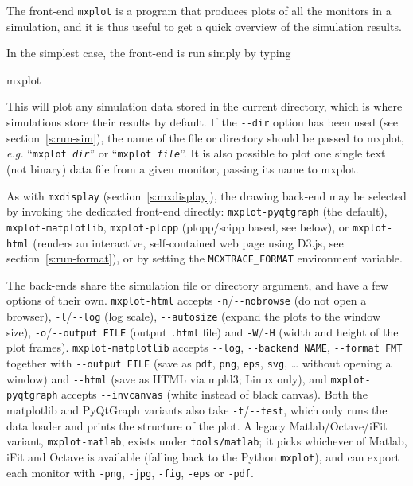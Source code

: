 The front-end \verb+mxplot+ is a program that produces
plots of all the monitors in a simulation, and it is thus useful to get
a quick overview of the simulation results.

In the simplest case, the front-end is run simply by typing
\begin{bash}
    mxplot
\end{bash}
This will plot any simulation data stored in the current directory, which is
where simulations store their results by default. If the \verb+--dir+
option has been used (see section~\ref{s:run-sim}), the name of
the file or directory should be passed to mxplot, {\em e.g.} ``\texttt{mxplot
  \textit{dir}}'' or ``\texttt{mxplot \textit{file}}''.  It is also possible to plot
one single text (not binary) data file from a given monitor, passing its name to
mxplot.

As with \texttt{mxdisplay} (section~\ref{s:mxdisplay}), the drawing back-end
may be selected by invoking the dedicated front-end directly:
\verb+mxplot-pyqtgraph+ (the default), \verb+mxplot-matplotlib+, \verb+mxplot-plopp+ (plopp/scipp based, see below), or
\verb+mxplot-html+ (renders an interactive, self-contained web page using
D3.js, see section~\ref{s:run-format}), or by setting the
\verb+MCXTRACE_FORMAT+ environment variable.

The back-ends share the simulation file or directory argument, and have a few
options of their own. \verb+mxplot-html+ accepts \verb+-n+/\verb+--nobrowse+ (do
not open a browser), \verb+-l+/\verb+--log+ (log scale), \verb+--autosize+
(expand the plots to the window size), \verb+-o+/\verb+--output FILE+ (output
\texttt{.html} file) and \verb+-W+/\verb+-H+ (width and height of the plot
frames). \verb+mxplot-matplotlib+ accepts \verb+--log+, \verb+--backend NAME+,
\verb+--format FMT+ together with \verb+--output FILE+ (save as
\texttt{pdf}, \texttt{png}, \texttt{eps}, \texttt{svg}, \ldots{} without opening
a window) and \verb+--html+ (save as HTML via mpld3; Linux only), and
\verb+mxplot-pyqtgraph+ accepts \verb+--invcanvas+ (white instead of black
canvas). Both the matplotlib and PyQtGraph variants also take \verb+-t+/\verb+--test+,
which only runs the data loader and prints the structure of the plot.
A legacy Matlab/Octave/iFit variant, \verb+mxplot-matlab+, exists under
\texttt{tools/matlab}; it picks whichever of Matlab, iFit and Octave is
available (falling back to the Python \verb+mxplot+), and can export each
monitor with \texttt{-png}, \texttt{-jpg}, \texttt{-fig}, \texttt{-eps} or
\texttt{-pdf}.

